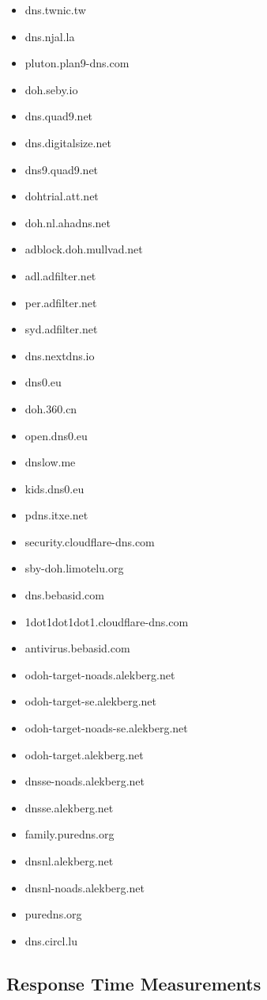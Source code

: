 \begin{small}
\begin{itemize}
\item dns.twnic.tw
\item dns.njal.la
\item pluton.plan9-dns.com
\item doh.seby.io
\item dns.quad9.net
\item dns.digitalsize.net
\item dns9.quad9.net
\item dohtrial.att.net
\item doh.nl.ahadns.net
\item adblock.doh.mullvad.net
\item adl.adfilter.net
\item per.adfilter.net
\item syd.adfilter.net
\item dns.nextdns.io
\item dns0.eu
\item doh.360.cn
\item open.dns0.eu
\item dnslow.me
\item kids.dns0.eu
\item pdns.itxe.net
\item security.cloudflare-dns.com
\item sby-doh.limotelu.org
\item dns.bebasid.com
\item 1dot1dot1dot1.cloudflare-dns.com
\item antivirus.bebasid.com
\item odoh-target-noads.alekberg.net
\item odoh-target-se.alekberg.net
\item odoh-target-noads-se.alekberg.net
\item odoh-target.alekberg.net
\item dnsse-noads.alekberg.net
\item dnsse.alekberg.net
\item family.puredns.org
\item dnsnl.alekberg.net
\item dnsnl-noads.alekberg.net
\item puredns.org
\item dns.circl.lu
\end{itemize}
\end{small}

\subsection{Response Time Measurements}

